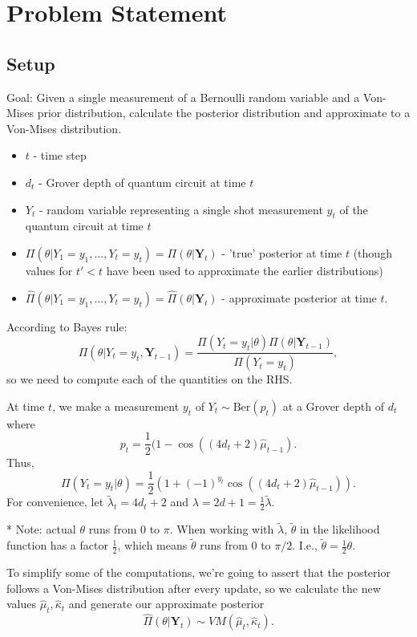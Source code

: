 \documentclass[]{report}
\begin{document}
\chapter{Problem Statement}
\section{Setup}
Goal: Given a single measurement of a Bernoulli random variable and a Von-Mises prior distribution, calculate the posterior distribution and approximate to a Von-Mises distribution.

\begin{itemize}
	\item $t$ - time step
	\item $d_t$ - Grover depth of quantum circuit at time $t$
	\item $Y_t$ - random variable representing a single shot measurement $y_t$ of the quantum circuit at time $t$
	\item $\Pi(\theta| Y_1 = y_1, \ldots, Y_t = y_t) = \Pi(\theta | \mathbf{Y}_t )$ - 'true' posterior at time $t$ (though values for $t ' < t$ have been used to approximate the earlier distributions)
	\item  $\hat{\Pi}(\theta| Y_1 = y_1, \ldots, Y_t = y_t) = \hat{\Pi}(\theta | \mathbf{Y}_t )$ - approximate posterior at time $t$.
\end{itemize}

According to Bayes rule:
\[
\Pi (\theta | Y_t = y_t, \mathbf{Y}_{t -1}) = \frac{\Pi(Y_t = y_t | \theta) \Pi(\theta | \mathbf{Y}_{t-1})}{\Pi(Y_t = y_t) },
\]
so we need to compute each of the quantities on the RHS.

At time $t$, we make a measurement $y_t$ of $Y_t \sim \text{Ber}(p_t)$ at a Grover depth of $d_t$ where
\[
	p_t = \frac{1}{2}(1 - \cos((4d_t + 2) \hat{\mu}_{t-1}).
\]
Thus,
\[
\Pi(Y_t = y_t | \theta) =  \frac{1}{2}(1 + (-1)^{y_t} \cos((4d_t + 2) \hat{\mu}_{t-1})).
\]
For convenience, let $\tilde{\lambda}_t = 4d_t + 2$ and $\lambda = 2d + 1 = \frac{1}{2}\tilde{\lambda}$.

* Note: actual $\theta$ runs from $0$ to $\pi$. When working with $\tilde{\lambda}$, $\tilde{\theta}$ in the likelihood function has a factor $\frac{1}{2}$, which means $\tilde{\theta}$ runs from $0$ to $\pi/2$. I.e., $\tilde{\theta} = \frac{1}{2} \theta$.


To simplify some of the computations, we're going to assert that the posterior follows a Von-Mises distribution after every update, so we calculate the new values $\hat{\mu}_t, \hat{\kappa}_t$ and generate our approximate posterior
\[
\hat{\Pi}(\theta | \mathbf{Y}_t )  \sim VM(\hat{\mu}_t, \hat{\kappa}_t).
\]
\end{document}
